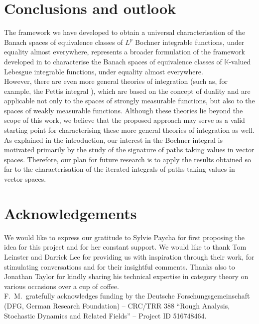 \documentclass{amsart}
\theoremstyle{definition}
\theoremstyle{plain}
\newcommand{\K}{\mathbb{K}}
\begin{document}
\section{Conclusions and outlook}
\label{sec:conclusions and outlook}

    The framework we have developed to obtain a universal characterisation of the Banach spaces of equivalence classes of $L^p$ Bochner integrable functions, under equality almost everywhere, represents a broader formulation of the framework developed in \cite{Leinster2023} to characterise the Banach spaces of equivalence classes of $\K$-valued Lebesgue integrable functions, under equality almost everywhere. \\
    However, there are even more general theories of integration (such as, for example, the Pettis integral \cite{Talagrand1984}), which are based on the concept of duality and are applicable not only to the spaces of strongly measurable functions, but also to the spaces of weakly measurable functions. 
    Although these theories lie beyond the scope of this work, we believe that the proposed approach may serve as a valid starting point for characterising these more general theories of integration as well. \\
    As explained in the introduction, our interest in the Bochner integral is motivated primarily by the study of the signature of paths taking values in vector spaces. 
    Therefore, our plan for future research is to apply the results obtained so far to the characterisation of the iterated integrals of paths taking values in vector spaces.


\section*{Acknowledgements}

    We would like to express our gratitude to Sylvie Paycha for first proposing the idea for this project and for her constant support. 
    We would like to thank Tom Leinster and Darrick Lee for providing us with inspiration through their work, for stimulating conversations and for their insightful comments. 
    Thanks also to Jonathan Taylor for kindly sharing his technical expertise in category theory on various occasions over a cup of coffee. \\
    F.~M.~gratefully acknowledges funding by the Deutsche Forschungsgemeinschaft (DFG, German Research Foundation) -- CRC/TRR 388 ``Rough Analysis, Stochastic Dynamics and Related Fields'' -- Project ID 516748464.
\end{document}
